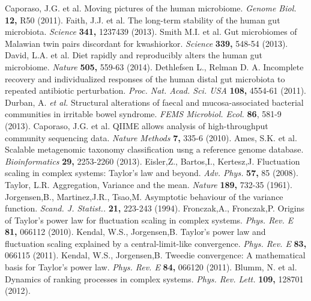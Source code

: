 \documentclass[12pt]{article}
\begin{document}
\begin{thebibliography}{1}
 Caporaso, J.G. et al. Moving pictures of the human microbiome. {\it Genome Biol.} {\bf 12,} R50 (2011).
 Faith, J.J. et al. The long-term stability of the human gut microbiota. {\it Science} {\bf 341,} 1237439 (2013).
 Smith M.I. et al. Gut microbiomes of Malawian twin pairs discordant for kwashiorkor. {\it Science} {\bf 339,} 548-54 (2013).
 David, L.A. et al. Diet rapidly and reproducibly alters the human gut microbiome. {\it Nature} {\bf 505,} 559-63 (2014).
 Dethlefsen L., Relman D. A. Incomplete recovery and individualized responses of the human distal gut microbiota to repeated antibiotic perturbation. {\it Proc. Nat. Acad. Sci. USA} {\bf 108,} 4554-61 (2011).
 Durban, A. \textit{et al.} Structural alterations of faecal and mucosa-associated bacterial communities in irritable bowel syndrome. {\it FEMS Microbiol. Ecol.} {\bf 86}, 581-9 (2013).
 Caporaso, J.G. et al. QIIME allows analysis of high-throughput community sequencing data. {\it Nature Methods} {\bf 7,} 335-6 (2010).
 Ames, S.K. et al. Scalable metagenomic taxonomy classification usng a reference genome database. {\it Bioinformatics} {\bf 29,} 2253-2260 (2013).
 Eisler,Z., Bartos,I., Kertesz,J. Fluctuation scaling in complex systems: Taylor's law and beyond. {\it Adv. Phys.} {\bf 57,} 85 (2008).
 Taylor, L.R. Aggregation, Variance and the mean. {\it Nature} {\bf 189,} 732-35 (1961).
 Jorgensen,B., Martinez,J.R., Tsao,M. Asymptotic behaviour of the variance function. {\it Scand. J. Statist..} {\bf 21,} 223-243 (1994).
 Fronczak,A., Fronczak,P. Origins of Taylor's power law for fluctuation scaling in complex systems. {\it Phys. Rev. E} {\bf 81,} 066112 (2010).
 Kendal, W.S., Jorgensen,B. Taylor's power law and fluctuation scaling explained by a central-limit-like convergence. {\it Phys. Rev. E} {\bf 83,} 066115 (2011).
 Kendal, W.S., Jorgensen,B. Tweedie convergence: A mathematical basis for Taylor's power law. {\it Phys. Rev. E} {\bf 84,} 066120 (2011).
 Blumm, N. et al. Dynamics of ranking processes in complex systems. {\it Phys. Rev. Lett.} {\bf 109,} 128701 (2012).
\end{thebibliography}
\end{document}
